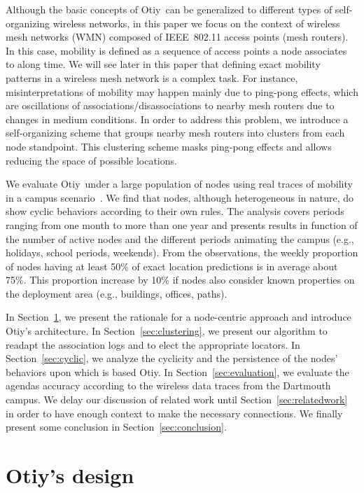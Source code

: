 \documentclass[a4paper]{sig-alternate-10pt}
\newcommand{\otiy}{{\sffamily Otiy}}
\begin{document}
Although the basic concepts of \otiy\ can be generalized to
different types of self-organizing wireless networks, in this paper
we focus on the context of wireless mesh networks (WMN) composed of
IEEE~802.11 access points (mesh routers). In this case, mobility is
defined as a sequence of access points a node associates to along
time. We will see later in this paper that defining exact mobility
patterns in a wireless mesh network is a complex task. For instance,
misinterpretations of mobility may happen mainly due to ping-pong
effects, which  are oscillations of associations/disassociations to
nearby mesh routers due to changes in medium conditions. In order
to address this problem, we introduce a self-organizing scheme that
groups nearby mesh routers into clusters from each node standpoint.
This clustering scheme masks ping-pong effects and allows reducing
the space of possible locations.

We evaluate \otiy\ under a large population of nodes using real
traces of mobility in a campus
scenario~\cite{dartmouth-campus-syslog}. We find that nodes,
although heterogeneous in nature, do show cyclic behaviors according
to their own rules. The analysis covers periods ranging from one
month to more than one year and presents results in function of 
the number of active nodes and the different periods animating 
the campus (e.g., holidays, school periods, weekends). From the 
observations, the weekly proportion of nodes having at least 
50\% of exact location predictions is in average about 75\%. 
This proportion increase by 10\% if nodes also consider known 
properties on the deployment area (e.g., buildings, offices, paths).

In Section~\ref{sec:basics}, we present the rationale for a
node-centric approach and introduce \otiy's architecture. In
Section~\ref{sec:clustering}, we present our algorithm to readapt
the association logs and to elect the appropriate locators. In
Section~\ref{sec:cyclic}, we analyze the cyclicity and the
persistence of the nodes' behaviors upon which is based \otiy. In
Section~\ref{sec:evaluation}, we evaluate the agendas accuracy 
according to the wireless data traces from the Dartmouth
campus. We delay our discussion of related work until
Section~\ref{sec:relatedwork} in order to have enough context to
make the necessary connections. We finally present some conclusion
in Section~\ref{sec:conclusion}.



\section{Otiy's design}
\label{sec:basics}
\end{document}
